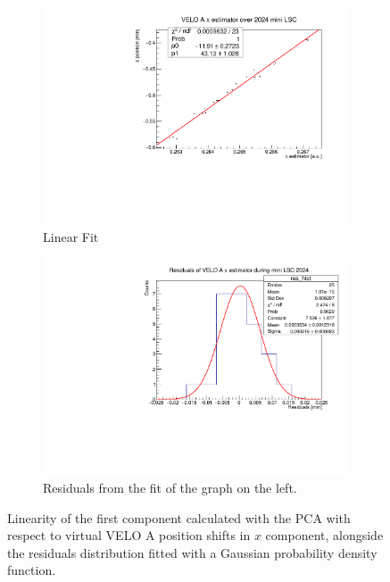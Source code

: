 \begin{figure}
    \centering
    \begin{subfigure}{0.48\textwidth}
    \includegraphics[width=\linewidth]{figures/x_fit_VELO_A_data.pdf}
    \caption{Linear Fit}\label{fig:x_veloA_fit_data}
    \end{subfigure}
    \begin{subfigure}{0.48\textwidth}
    \includegraphics[width=\linewidth]{figures/x_res_VELO_A_data.pdf}
    \caption{Residuals from the fit of the graph on the left. }\label{fig:x_veloA_res_data}
    \end{subfigure}
    \caption{Linearity of the first component calculated with the PCA with respect to virtual VELO A position shifts in $x$ component, alongside the residuals distribution fitted with a Gaussian probability density function.}
    \label{fig:x_veloA_data}
\end{figure}


